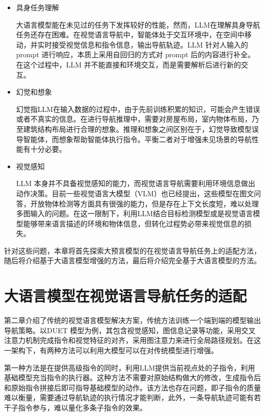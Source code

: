 \documentclass[bachelor]{thesis-uestc}
\begin{document}
\begin{itemize}
    \item 具身任务理解
    
    大语言模型能在未见过的任务下发挥较好的性能，然而，LLM在理解具身导航任务还存在困难。在视觉语言导航中，智能体处于交互环境中，在空间中移动，并实时接受视觉信息和指令信息，输出导航轨迹。LLM 针对人输入的 prompt 进行响应，本质上采用自回归的方式对 prompt 后的内容进行补全。在这个过程中，LLM 并不能直接和环境交互，而是需要解析后进行新的交互。

    \item 幻觉和想象
    
    幻觉指LLM在输入数据的过程中，由于先前训练积累的知识，可能会产生错误或者不真实的信息。在进行导航推理中，需要对房屋布局，室内物体布局，乃至建筑结构布局进行合理的想象。推理和想象之间区别在于，幻觉导致模型误导智能体，而想象帮助智能体执行指令。平衡二者对于增强未见场景的导航性能有十分必要。

    \item 视觉感知
    
    LLM 本身并不具备视觉感知的能力，而视觉语言导航需要利用环境信息做出动作决策。目前一些视觉语言大模型（VLM）也已经提出，这些模型在图文问答，开放物体检测等方面具有很强的能力，但是存在上下文长度短，难以处理多图输入的问题。在这一限制下，利用LLM结合目标检测模型或是视觉语言模型能够带来语言描述的环境和物体信息，但转化过程势必带来视觉信息的损失。
\end{itemize}

针对这些问题，本章将首先探索大预言模型的在视觉语言导航任务上的适配方法，随后将介绍基于大语言模型增强的方法，最后将介绍完全基于大语言模型的方法。

\section{大语言模型在视觉语言导航任务的适配}

第二章介绍了传统的视觉语言模型解决方案，传统方法训练一个端到端的模型输出导航策略。以DUET 模型为例，其包含视觉感知，图信息记录等功能，采用交叉注意力机制完成指令和视觉特征的对齐，采用图注意力来进行全局路径规划。在这一架构下，有两种方法可以利用大模型可以在对传统模型进行增强。

第一种方法是在提供高级指令的同时，利用LLM提供当前视点处的子指令，利用基础模型充当指令的执行器。这种方法不需要对原始结构做大的修改，生成指令后和原始指令拼接后即可指导基础模型的动作。该方法也存在问题，即子指令的质量难以衡量，需要通过导航轨迹的执行情况才能判断，此外，一条导航轨迹可能有若干子指令参与，难以量化多条子指令的效果。
\end{document}
